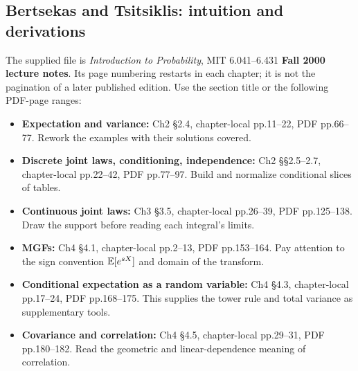 \subsection{Bertsekas and Tsitsiklis: intuition and derivations}
The supplied file is \emph{Introduction to Probability}, MIT 6.041--6.431 \textbf{Fall 2000 lecture notes}. Its page numbering restarts in each chapter; it is not the pagination of a later published edition. Use the section title or the following PDF-page ranges:
\begin{itemize}
\item \textbf{Expectation and variance:} Ch2 \S2.4, chapter-local pp.11--22, PDF pp.66--77. Rework the examples with their solutions covered.
\item \textbf{Discrete joint laws, conditioning, independence:} Ch2 \S\S2.5--2.7, chapter-local pp.22--42, PDF pp.77--97. Build and normalize conditional slices of tables.
\item \textbf{Continuous joint laws:} Ch3 \S3.5, chapter-local pp.26--39, PDF pp.125--138. Draw the support before reading each integral's limits.
\item \textbf{MGFs:} Ch4 \S4.1, chapter-local pp.2--13, PDF pp.153--164. Pay attention to the sign convention $\mathbb E[e^{sX}]$ and domain of the transform.
\item \textbf{Conditional expectation as a random variable:} Ch4 \S4.3, chapter-local pp.17--24, PDF pp.168--175. This supplies the tower rule and total variance as supplementary tools.
\item \textbf{Covariance and correlation:} Ch4 \S4.5, chapter-local pp.29--31, PDF pp.180--182. Read the geometric and linear-dependence meaning of correlation.
\end{itemize}

